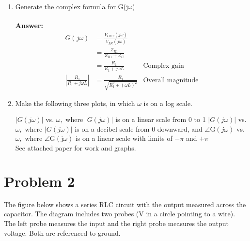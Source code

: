 \documentclass[12pt, a4paper]{article}
\begin{document}
\begin{enumerate}

\item Generate the complex formula for G(j$\omega$) \\ \\
\textbf{Answer: } \\
\begin{align*}
G(j\omega) &= \frac{V_{OUT}(j\omega)}{V_{IN}(j\omega)} \\
&= \frac{Z_{R1}}{Z_{R1} + Z_{C}}\\
&= \frac{R_1}{R_1 + j\omega L} &\text{Complex gain} \\
\left |  \frac{R_1}{R_1 + j\omega L} \right | &= \frac{R_1}{\sqrt{R_1^2 +( \omega L) ^2}}  &\text{Overall magnitude}
\end{align*}
\item Make the following three plots, in which $\omega$ is on a log scale.

\subitem $|G(j \omega)|$ vs. $\omega,$ where $|G(j \omega)|$ is on a linear scale from 0 to 1
\subitem $|G(j \omega)|$ vs. $\omega,$ where $|G(j \omega)|$ is on a decibel scale from 0 downward, and
\subitem $\angle \mathrm{G}(j \omega)$ vs. $\omega,$ where $\angle \mathrm{G}(\mathrm{j} \omega)$ is on a linear scale with limits of $-\pi$ and $+\pi$ \\

See attached paper for work and graphs.
\end{enumerate}
\section*{Problem 2}
The figure below shows a series RLC circuit with the output measured across the capacitor.
The diagram includes two probes (V in a circle pointing to a wire). The left probe measures
the input and the right probe measures the output voltage. Both are referenced to ground.
\end{document}
